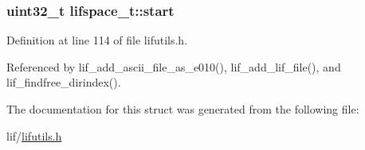 \subsubsection[{\texorpdfstring{start}{start}}]{\setlength{\rightskip}{0pt plus 5cm}uint32\+\_\+t lifspace\+\_\+t\+::start}\hypertarget{structlifspace__t_a35702daf31460f978a09aef7a42c2671}{}\label{structlifspace__t_a35702daf31460f978a09aef7a42c2671}


Definition at line 114 of file lifutils.\+h.



Referenced by lif\+\_\+add\+\_\+ascii\+\_\+file\+\_\+as\+\_\+e010(), lif\+\_\+add\+\_\+lif\+\_\+file(), and lif\+\_\+findfree\+\_\+dirindex().



The documentation for this struct was generated from the following file\+:\begin{DoxyCompactItemize}
\item 
lif/\hyperlink{lifutils_8h}{lifutils.\+h}\end{DoxyCompactItemize}
